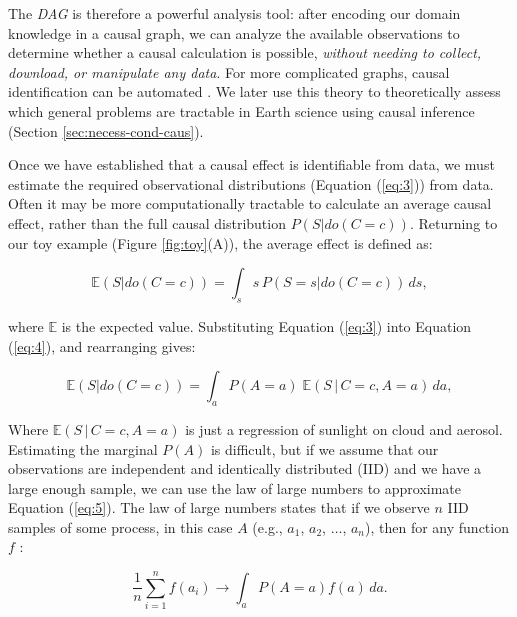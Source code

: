 \documentclass[12pt]{article}
\begin{document}
The \emph{DAG} is therefore a powerful analysis tool: after encoding
our domain knowledge in a causal graph, we can analyze the available
observations to determine whether a causal calculation is possible,
\textit{without needing to collect, download, or manipulate any
  data}. For more complicated graphs, causal identification can be
automated \citep[][ and \url{http://www.dagitty.net/},
\url{https://causalfusion.net}]{tian2002general,shpitser2006,huang2006identifiability,Bareinboim7345,
  textor2017,}. We later use this theory to theoretically assess which
general problems are tractable in Earth science using causal inference
(Section \ref{sec:necess-cond-caus}).

Once we have established that a causal effect is identifiable from
data, we must estimate the required observational distributions
(Equation (\ref{eq:3})) from data. Often it may be more
computationally tractable to calculate an average causal effect,
rather than the full causal distribution $P(S | do(C=c))$. Returning
to our toy example (Figure \ref{fig:toy}(A)), the average effect is
defined as:

\begin{equation} \mathbb{E}(S | do(C = c)) = \int_{s} s \, P(S = s |
  do(C=c)) \, ds,
  \label{eq:4}
\end{equation}

where $\mathbb{E}$ is the expected value. Substituting Equation
(\ref{eq:3}) into Equation (\ref{eq:4}), and rearranging gives:

\begin{equation} \mathbb{E}(S | do(C = c)) = \int_{a} P(A=a) \;
  \mathbb{E}(S \, | \, C=c, A=a) \, d a,
  \label{eq:5}
\end{equation}

Where $\mathbb{E}(S \, | \, C=c, A=a)$ is just a regression of
sunlight on cloud and aerosol. Estimating the marginal $P(A)$ is
difficult, but if we assume that our observations are independent and
identically distributed (IID) and we have a large enough sample, we
can use the law of large numbers to approximate Equation
(\ref{eq:5}). The law of large numbers states that if we observe $n$
IID samples of some process, in this case $A$ (e.g., $a_1$, $a_2$,
$\ldots$, $a_n$), then for any function $f$ \citep{shalizi2013}:

\begin{equation} \frac{1}{n} \sum_{i=1}^n f(a_i) \to \int_a P(A=a)
  f(a) \, d a.
  \label{eq:lln}
\end{equation}
\end{document}
